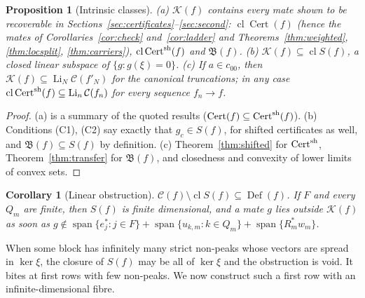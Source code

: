 \documentclass[10pt]{amsart}
\newtheorem{proposition}[theorem]{Proposition}
\newtheorem{corollary}[theorem]{Corollary}
\theoremstyle{definition}
\theoremstyle{remark}
\newcommand{\spn}{\operatorname{span}}
\newcommand{\Cset}{\mathcal C}
\newcommand{\Cert}{\operatorname{Cert}}
\newcommand{\Li}{\operatorname*{Li}}
\newcommand{\cl}{\operatorname{cl}}
\newcommand{\Def}{\operatorname{Def}}
\begin{document}
\begin{proposition}[Intrinsic classes]\label{prop:intrinsic}
\textup{(a)} $\mathcal K(f)$ contains every mate shown to be recoverable in
Sections~\ref{sec:certificates}--\ref{sec:second}: $\cl\Cert(f)$ (hence the
mates of Corollaries~\ref{cor:check} and~\ref{cor:ladder} and
Theorems~\ref{thm:weighted}, \ref{thm:locsplit}, \ref{thm:carriers}),
$\cl\Cert^{\rm sh}(f)$ and $\mathfrak B(f)$.
\textup{(b)} $\mathcal K(f)\subseteq\cl S(f)$, a closed linear subspace of
$\{g:g(\xi)=0\}$.
\textup{(c)} If $a\in c_{00}$, then $\mathcal K(f)\subseteq\Li_N\Cset(f'_N)$
for the canonical truncations; in any case $\cl\Cert^{\rm sh}(f)\subseteq
\Li_n\Cset(f_n)$ for every sequence $f_n\to f$.
\end{proposition}

\begin{proof}
(a) is a summary of the quoted results ($\Cert(f)\subseteq\Cert^{\rm
sh}(f)$).  (b) Conditions (C1), (C2) say exactly that $g_c\in S(f)$, for
shifted certificates as well, and $\mathfrak B(f)\subseteq S(f)$ by
definition.  (c) Theorem~\ref{thm:shifted} for $\Cert^{\rm sh}$,
Theorem~\ref{thm:transfer} for $\mathfrak B(f)$, and closedness and
convexity of lower limits of convex sets.
\end{proof}

\begin{corollary}[Linear obstruction]\label{cor:linear}
$\Cset(f)\setminus\cl S(f)\subseteq\Def(f)$.  If $F$ and every $Q_m$ are
finite, then $S(f)$ is finite dimensional, and a mate $g$ lies outside
$\mathcal K(f)$ as soon as $g\notin\spn\{e_j^*:j\in F\}+\spn\{u_{k,m}:k\in
Q_m\}+\spn\{R_m^*w_m\}$.
\end{corollary}

When some block has infinitely many strict non-peaks whose vectors are
spread in $\ker\xi$, the closure of $S(f)$ may be all of $\ker\xi$ and the
obstruction is void.  It bites at first rows with few non-peaks.  We now
construct such a first row with an infinite-dimensional fibre.
\end{document}
